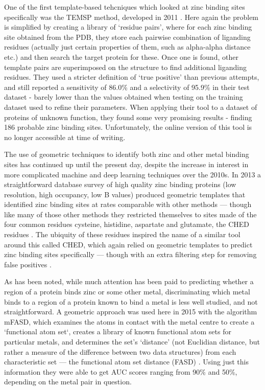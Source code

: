 One of the first template-based tehcniques which looked at zinc binding sites specifically was the TEMSP method, developed in 2011 \cite{zhao2011structure}. Here again the problem is simplified by creating a library of `residue pairs', where for each zinc binding site obtained from the PDB, they store each pairwise combination of liganding residues (actually just certain properties of them, such as alpha-alpha distance etc.) and then search the target protein for these. Once one is found, other template pairs are superimposed on the structure to find additional liganding residues. They used a stricter definition of `true positive' than previous attempts, and still reported a sensitivity of 86.0\% and a selectivity of 95.9\% in their test dataset - barely lower than the values obtained when testing on the training dataset used to refine their parameters. When applying their tool to a dataset of proteins of unknown function, they found some very promising results - finding 186 probable zinc binding sites.  Unfortunately, the online version of this tool is no longer accessible at time of writing.

The use of geometric techniques to identify both zinc and other metal binding sites has continued up until the present day, despite the increase in interest in more complicated machine and deep learning techniques over the 2010s. In 2013 a straightforward database survey of high quality zinc binding proteins (low resolution, high occupancy, low B values) produced geometric templates that identified zinc binding sites at rates comparable with other methods --- though like many of those other methods they restricted themselves to sites made of the four common residues cysteine, histidine, aspartate and glutamate, the CHED residues \cite{liu2014}. The ubiquity of these residues inspired the name of a similar tool around this called CHED, which again relied on geometric templates to predict zinc binding sites specifically --- though with an extra filtering step for removing false positives \cite{sobolev2013web}.

As has been noted, while much attention has been paid to predicting whether a region of a protein binds zinc or some other metal, discriminating which metal binds to a region of a protein known to bind a metal is less well studied, and not straightforward. A geometric approach was used here in 2015 with the algorithm mFASD, which examines the atoms in contact with the metal centre to create a `functional atom set`, creates a library of known functional atom sets for particular metals, and determines the set's `distance' (not Euclidian distance, but rather a measure of the difference between two data structures) from each characteristic set --- the functional atom set distance (FASD) \cite{he2015}. Using just this information they were able to get AUC scores ranging from 90\% and 50\%, depending on the metal pair in question. 

